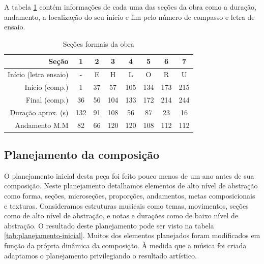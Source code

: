 A tabela \ref{tab:secoes-obra} contém informações de cada uma das
seções da obra como a duração, andamento, a localização do seu início
e fim pelo número de compasso e letra de ensaio.

\begin{table}
  \centering
  \begin{tabular}{r|ccccccc}
    Seção & 1 & 2 & 3 & 4 & 5 & 6 & 7 \\
    \hline
    Início (letra ensaio) & - & E & H & L & O & R & U \\
    Início (comp.) & 1 & 37 & 57 & 105 & 134 & 173 & 215 \\
    Final (comp.) & 36 & 56 & 104 & 133 & 172 & 214 & 244 \\
    Duração aprox. (s) & 132 & 91 & 108 & 56 & 87 & 23 & 16\\
    Andamento M.M & 82 & 66 & 120 & 120 & 108 & 112 & 112 \\
  \end{tabular}
  \caption{Seções formais da obra}
  \label{tab:secoes-obra}
\end{table}

\subsection{Planejamento da composição}
\label{sec:plan-da-comp}

O planejamento inicial desta peça foi feito pouco menos de um ano
antes de sua composição. Neste planejamento detalhamos elementos de
alto nível de abstração como forma, seções, microseções, proporções,
andamentos, metas composicionais e texturas. Consideramos estruturas
musicais como temas, movimentos, seções como de alto nível de
abstração, e notas e durações como de baixo nível de abstração. O
resultado deste planejamento pode ser visto na tabela
\ref{tab:planejamento-inicial}. Muitos dos elementos planejados foram
modificados em função da própria dinâmica da composição. À medida que
a música foi criada adaptamos o planejamento privilegiando o resultado
artístico.

